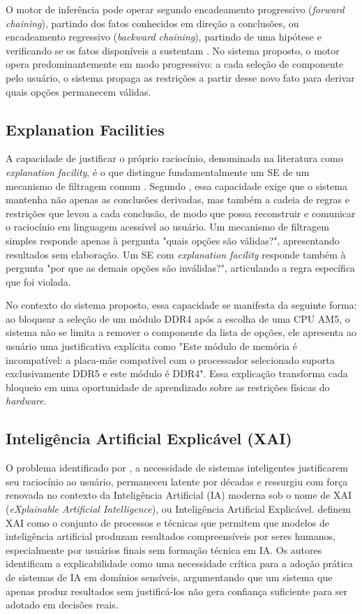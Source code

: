 O motor de inferência pode operar segundo encadeamento progressivo (\textit{forward chaining}),
partindo dos fatos conhecidos em direção a conclusões, ou encadeamento regressivo (\textit{backward chaining}),
partindo de uma hipótese e verificando se os fatos disponíveis a sustentam \cite{Russell2010}.
No sistema proposto, o motor opera predominantemente em modo progressivo: a cada seleção de componente
pelo usuário, o sistema propaga as restrições a partir desse novo fato para derivar quais opções
permanecem válidas.

\subsection{Explanation Facilities}
A capacidade de justificar o próprio raciocínio, denominada na literatura como
\textit{explanation facility}, é o que distingue fundamentalmente um SE de um mecanismo
de filtragem comum \cite{Clancey1983}. Segundo \cite{Clancey1983}, essa capacidade exige que o sistema
mantenha não apenas as conclusões derivadas, mas também a cadeia de regras e restrições que
levou a cada conclusão, de modo que possa reconstruir e comunicar o raciocínio em linguagem
acessível ao usuário. Um mecanismo de filtragem simples responde apenas à pergunta "quais opções são válidas?",
apresentando resultados sem elaboração. Um SE com \textit{explanation facility} responde também à pergunta
"por que as demais opções são inválidas?", articulando a regra específica que foi violada.

No contexto do sistema proposto, essa capacidade se manifesta da seguinte forma: ao bloquear a seleção de um módulo DDR4 após
a escolha de uma CPU AM5, o sistema não se limita a remover o componente da lista de opções,
ele apresenta ao usuário uma justificativa explícita como "Este módulo de memória é incompatível: a placa-mãe
compatível com o processador selecionado suporta exclusivamente DDR5 e este módulo é DDR4". Essa explicação
transforma cada bloqueio em uma oportunidade de aprendizado sobre as restrições físicas do \textit{hardware}.

\subsection{Inteligência Artificial Explicável (XAI)}
O problema identificado por \textcite{Clancey1983}, a necessidade de sistemas inteligentes justificarem seu
raciocínio ao usuário, permaneceu latente por décadas e ressurgiu com força renovada no contexto da Inteligência Artificial (IA)
moderna sob o nome de XAI (\textit{eXplainable Artificial Intelligence}), ou Inteligência Artificial Explicável. \textcite{Arrieta2020}
definem XAI como o conjunto de processos e técnicas que permitem que modelos de inteligência artificial produzam
resultados compreensíveis por seres humanos, especialmente por usuários finais sem formação técnica em IA.
Os autores identificam a explicabilidade como uma necessidade crítica para a adoção prática de sistemas de IA em domínios
sensíveis, argumentando que um sistema que apenas produz resultados sem justificá-los não gera confiança suficiente para
ser adotado em decisões reais.

